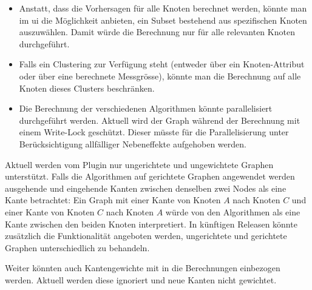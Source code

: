 \begin{itemize}
    \item Anstatt, dass die Vorhersagen für alle Knoten berechnet werden, könnte man im \acs{ui} die Möglichkeit anbieten, ein Subset bestehend aus spezifischen Knoten auszuwählen. Damit würde die Berechnung nur für alle relevanten Knoten durchgeführt.
    \item Falls ein Clustering zur Verfügung steht (entweder über ein Knoten-Attribut oder über eine berechnete Messgrösse), könnte man die Berechnung auf alle Knoten dieses Clusters beschränken.
    \item Die Berechnung der verschiedenen Algorithmen könnte parallelisiert durchgeführt werden. Aktuell wird der Graph während der Berechnung mit einem Write-Lock geschützt. Dieser müsste für die Parallelisierung unter Berücksichtigung allfälliger Nebeneffekte aufgehoben werden.
\end{itemize}

Aktuell werden vom Plugin nur ungerichtete und ungewichtete Graphen unterstützt.
Falls die Algorithmen auf gerichtete Graphen angewendet werden ausgehende und eingehende Kanten zwischen denselben zwei Nodes als eine Kante betrachtet:
Ein Graph mit einer Kante von Knoten $A$ nach Knoten $C$ und einer Kante von Knoten $C$ nach Knoten $A$ würde von den Algorithmen als eine Kante zwischen den beiden Knoten interpretiert.
In künftigen Releasen könnte zusätzlich die Funktionalität angeboten werden, ungerichtete und gerichtete Graphen unterschiedlich zu behandeln.

Weiter könnten auch Kantengewichte mit in die Berechnungen einbezogen werden.
Aktuell werden diese ignoriert und neue Kanten nicht gewichtet.

